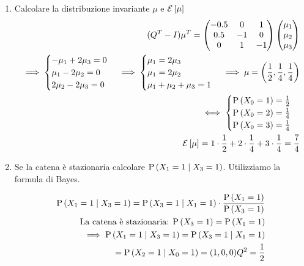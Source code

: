 \begin{exrc}
\begin{enumerate}
		\item Calcolare la distribuzione invariante $ \mu $ e $ \mathcal{E}\left[\mu\right] $ 
		\begin{equation*}
			\begin{aligned}
			(Q^T-I)\mu^T = \begin{pmatrix}
			-0.5 & 0 & 1 \\
			0.5 & -1 & 0 \\
			0 & 1 & -1
			\end{pmatrix} \begin{pmatrix}
			\mu_1 \\ \mu_2 \\ \mu_3
			\end{pmatrix} \\
			\implies \begin{cases}
			- \mu_1 + 2\mu_3 = 0 \\ 
			\mu_1 - 2\mu_2 = 0 \\
			2\mu_2 - 2\mu_3 = 0
			\end{cases} \implies \begin{cases}
			\mu_1 = 2\mu_3 \\
			\mu_1 = 2\mu_2 \\
			\mu_1 + \mu_2 + \mu_3 = 1
			\end{cases} 
			\implies \mu = \left(\dfrac{1}{2}, \dfrac{1}{4}, \dfrac{1}{4}\right) \\ 
			\iff \begin{cases}
			\text{P}\left(X_0 = 1\right) = \frac{1}{2} \\
			\text{P}\left(X_0 = 2\right) = \frac{1}{4} \\
			\text{P}\left(X_0 = 3\right) = \frac{1}{4} \\	
			\end{cases} \\
			\mathcal{E}\left[\mu\right] = 1 \cdot \dfrac{1}{2} + 2 \cdot \dfrac{1}{4} + 3 \cdot \dfrac{1}{4} = \dfrac{7}{4}
			\end{aligned} 
		\end{equation*}
		
		\item Se la catena è stazionaria calcolare $ \text{P}\left(X_1 = 1 \mid X_3 = 1\right) $. Utilizziamo la formula di Bayes. 
		
		\begin{equation*}
			\begin{aligned}
			\text{P}\left(X_1 = 1 \mid X_3 = 1\right) = \text{P}\left(X_3 = 1 \mid X_1 = 1\right) \cdot \dfrac{\text{P}\left(X_1 = 1\right)}{\text{P}\left(X_3 = 1\right)} \\
			\text{La catena è stazionaria: } \text{P}\left(X_3 = 1\right) = \text{P}\left(X_1 = 1\right) \\
			\implies \text{P}\left(X_1 = 1 \mid X_3 = 1\right) = \text{P}\left(X_3 = 1 \mid X_1 = 1\right) \\ 
			= \text{P}\left(X_2 = 1 \mid X_0 = 1\right) = (1, 0, 0) Q^2 = \dfrac{1}{2}
			\end{aligned}
		\end{equation*}
	\end{enumerate}
\end{exrc}







